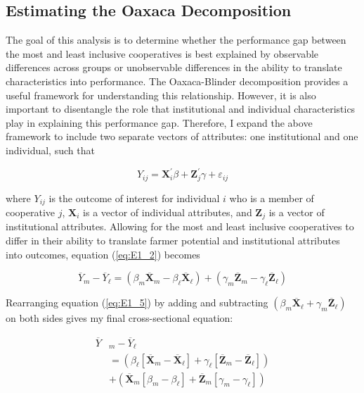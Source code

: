 \documentclass[11pt]{article}
\begin{document}
\subsection{Estimating the Oaxaca Decomposition} \label{sec:E1_est}

The goal of this analysis is to determine whether the performance gap between the most and least inclusive cooperatives is best explained by observable differences across groups or unobservable differences in the ability to translate characteristics into performance. The Oaxaca-Blinder decomposition provides a useful framework for understanding this relationship. However, it is also important to disentangle the role that institutional and individual characteristics play in explaining this performance gap. Therefore, I expand the above framework to include two separate vectors of attributes: one institutional and one individual, such that

\begin{equation} \label{eq:E1_4}
   Y_{ij} = \mathbf{X}_i^{\prime}\beta + \mathbf{Z}_j^{\prime}\gamma + \varepsilon_{ij}
\end{equation}  

where $Y_{ij}$ is the outcome of interest for individual $i$ who is a member of cooperative $j$, $\mathbf{X}_i$ is a vector of individual attributes, and $\mathbf{Z}_j$ is a vector of institutional attributes. Allowing for the most and least inclusive cooperatives to differ in their ability to translate farmer potential and institutional attributes into outcomes, equation (\ref{eq:E1_2}) becomes

\begin{equation} \label{eq:E1_5}
        \overline{Y}_{m} - \overline{Y}_{\ell} =  (\beta_{m}\overline{\mathbf{X}}_{m} - \beta_{\ell}\overline{\mathbf{X}}_{\ell}) + (\gamma_{m}\overline{\mathbf{Z}}_{m} - \gamma_{\ell}\overline{\mathbf{Z}}_{\ell})
\end{equation}  

Rearranging equation (\ref{eq:E1_5}) by adding and subtracting $(\beta_{m}\overline{\mathbf{X}}_{\ell} + \gamma_{m}\overline{\mathbf{Z}}_{\ell})$ on both sides gives my final cross-sectional equation:

\begin{subequations}
    \begin{align}
        \overline{Y}&_{m} - \overline{Y}_{\ell} \label{eq:E1_6a} \\
        &= (\beta_{\ell}[\overline{\mathbf{X}}_{m} - \overline{\mathbf{X}}_{\ell}] + \gamma_{\ell}[\overline{\mathbf{Z}}_{m} - \overline{\mathbf{Z}}_{\ell}]) \label{eq:E1_6b} \\
        &+ (\overline{\mathbf{X}}_{m}[\beta_{m} - \beta_{\ell}] + \overline{\mathbf{Z}}_{m}[\gamma_{m} - \gamma_{\ell}]) \label{eq:E1_6c}
    \end{align}
\end{subequations}  
\end{document}
